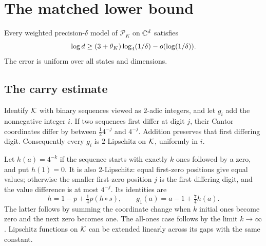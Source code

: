 \section{The matched lower bound}\label{sec:lower}
\begin{theorem}\label{thm:lower}
Every weighted precision-$\delta$ model of $\mathcal P_K$ on $\mathbb C^d$ satisfies
\begin{equation}\label{eq:lower}
 \log d\ge(3+\theta_K)\log_4(1/\delta)-o(\log(1/\delta)).
\end{equation}
The error is uniform over all states and dimensions.
\end{theorem}

\subsection{The carry estimate}
Identify $\mathcal K$ with binary sequences viewed as $2$-adic integers, and let $g_i$ add the nonnegative integer $i$. If two sequences first differ at digit $j$, their Cantor coordinates differ by between $\tfrac12 4^{-j}$ and $4^{-j}$. Addition preserves that first differing digit. Consequently every $g_i$ is $2$-Lipschitz on $\mathcal K$, uniformly in $i$.

Let $h(a)=4^{-k}$ if the sequence starts with exactly $k$ ones followed by a zero, and put $h(1)=0$. It is also $2$-Lipschitz: equal first-zero positions give equal values; otherwise the smaller first-zero position $j$ is the first differing digit, and the value difference is at most $4^{-j}$. Its identities are
\begin{equation}\label{eq:carry-functions}
 h=1-p+\tfrac14p(h\circ s),\qquad
 g_1(a)=a-1+\tfrac74h(a).
\end{equation}
The latter follows by summing the coordinate change when $k$ initial ones become zero and the next zero becomes one. The all-ones case follows by the limit $k\to\infty$. Lipschitz functions on $\mathcal K$ can be extended linearly across its gaps with the same constant.

